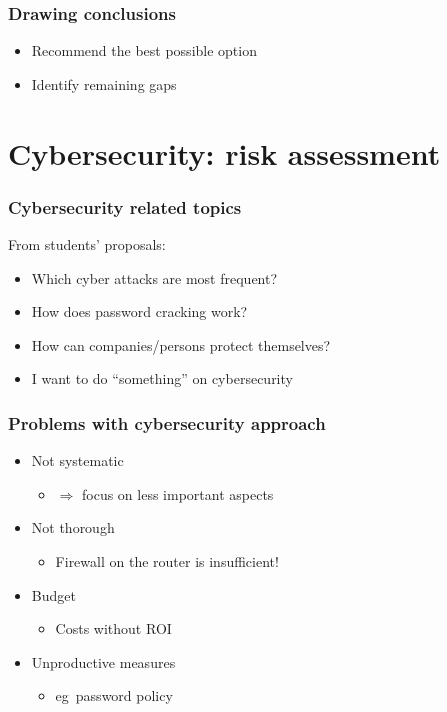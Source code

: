 \documentclass[aspectratio=169]{beamer}
\begin{document}
\begin{frame}
  \frametitle{Drawing conclusions}

  \begin{itemize}
    \item Recommend the best possible option
    \item Identify remaining gaps
  \end{itemize}
\end{frame}

\section{Cybersecurity: risk assessment}

\begin{frame}
  \frametitle{Cybersecurity related topics}

  From students' proposals:

  \begin{itemize}
    \item Which cyber attacks are most frequent?
    \item How does password cracking work?
    \item How can companies/persons protect themselves?
    \item I want to do ``something'' on cybersecurity
  \end{itemize}

  \bigskip


\end{frame}

\begin{frame}
  \frametitle{Problems with cybersecurity approach}

  \begin{itemize}
    \item Not systematic
          \begin{itemize}
            \item $\Rightarrow$ focus on less important aspects
          \end{itemize}
    \item Not thorough
          \begin{itemize}
            \item Firewall on the router is insufficient!
          \end{itemize}
    \item Budget
          \begin{itemize}
            \item Costs without ROI
          \end{itemize}
    \item Unproductive measures
          \begin{itemize}
            \item eg\ password policy
          \end{itemize}
  \end{itemize}

\end{frame}
\end{document}
